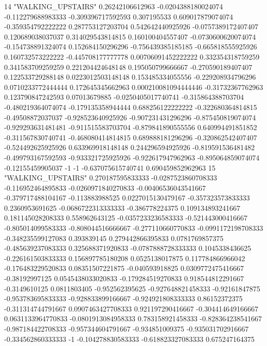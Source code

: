 14 "WALKING_UPSTAIRS" 0.26242106612963 -0.0204388180024074 -0.112279688983333 -0.309396717592593 0.307195533 0.609017879074074 -0.359354792222222 0.287753127203704 0.542642440925926 -0.0757389172407407 0.120689038037037 0.314029543814815 0.160100404557407 -0.0730600620074074 -0.154738891324074 0.152684150296296 -0.756439385185185 -0.665818555925926 0.160732573222222 -0.445708177777778 0.00706091452222222 0.332354318759259 0.341583709259259 0.221204424648148 0.195050799666667 -0.270590189407407 0.122533729288148 0.0223012503148148 0.153485334055556 -0.229208934796296 0.0710233772444444 0.172645345662963 0.000210081094444446 -0.31732367762963 0.123790847242593 0.07013679885 -0.0250405017740741 -0.315864388703704 -0.480219364074074 -0.179135358944444 0.688256122222222 -0.322680364814815 -0.49508872037037 -0.928523640925926 -0.907231431296296 -0.875450819074074 -0.929293631481481 -0.911515583703704 -0.879841890555556 0.640994491851852 -0.311567830740741 -0.468080414814815 0.689888181296296 -0.320862542407407 -0.524492625925926 0.633969918148148 0.244296594925926 -0.819591536481482 -0.499793167592593 -0.933321725925926 -0.922617947962963 -0.895064859074074 -0.12155459905037 -1 -1 -0.637075615740741 0.690459852962963
15 "WALKING_UPSTAIRS" 0.270187595833333 -0.0287523860708333 -0.116952464895833 -0.0260971840270833 -0.00406536043541667 -0.379717488104167 -0.113883988525 0.0227015130479167 -0.357323573833333 0.2360953691625 -0.0686722313333333 -0.386778224375 0.109134893241667 0.181145028208333 0.558962643125 -0.0357233236583333 -0.521443000416667 -0.805014099583333 -0.808044516666667 -0.277110660770833 -0.0991172198708333 -0.348235599127083 0.393839145 0.279442866395833 0.0781769857375 -0.485639237083333 0.325688371920833 -0.0787888728333333 0.1045338436625 -0.226161503833333 0.156897785180208 0.0525138017875 0.117784866966042 -0.176483229520833 0.08351507221875 -0.040593918825 0.0309772475416667 -0.38192997125 0.0545438033020833 -0.179284519270833 0.918544812291667 -0.3149610125 0.0811803405 -0.952562395625 -0.927648821458333 -0.92161847875 -0.953783695833333 -0.928833899166667 -0.924921808333333 0.86152372375 -0.311314744791667 0.0907463427708333 0.921197290416667 -0.304414649166667 0.0631133964770833 -0.0801913084958333 0.783158921458333 -0.828364238541667 -0.987184422708333 -0.957344604791667 -0.934851009375 -0.935031702916667 -0.334562860333333 -1 -0.104278830583333 -0.618823327083333 0.675247164375

